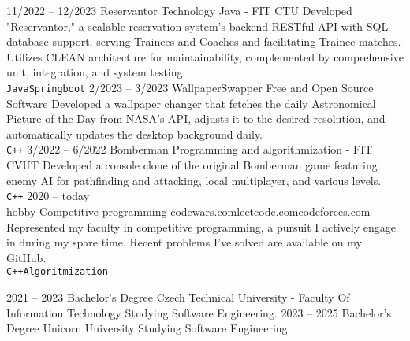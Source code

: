 \documentclass[9pt]{developercv} %
\begin{document}
\begin{entrylist}
	\entry
		{11/2022 -- 12/2023}
		{Reservantor}
		{Technology Java - FIT CTU}
		{Developed "Reservantor," a scalable reservation system's backend RESTful API with SQL database support, serving Trainees and Coaches and facilitating Trainee matches. Utilizes CLEAN architecture for maintainability, complemented by comprehensive unit, integration, and system testing.\\ \texttt{Java}\slashsep\texttt{Springboot}}
	\entry
		{2/2023 -- 3/2023}
		{WallpaperSwapper}
		{Free and Open Source Software}
		{Developed a wallpaper changer that fetches the daily Astronomical Picture of the Day from NASA's API, adjusts it to the desired resolution, and automatically updates the desktop background daily.\\ \texttt{C++}}
	\entry
		{3/2022 -- 6/2022}
		{Bomberman}
		{Programming and algorithmization - FIT CVUT}
		{Developed a console clone of the original Bomberman game featuring enemy AI for pathfinding and attacking, local multiplayer, and various levels.\\ \texttt{C++}}
	\entry
		{2020 -- today\\\footnotesize{hobby}}
		{Competitive programming}
		{codewars.com\slashsep leetcode.com\slashsep codeforces.com}
		{Represented my faculty in competitive programming, a pursuit I actively engage in during my spare time. Recent problems I've solved are available on my GitHub.\\ \texttt{C++}\slashsep\texttt{Algoritmization}}
\end{entrylist}



\begin{entrylist}
	\entry
		{2021 -- 2023}
		{Bachelor's Degree}
		{Czech Technical University - Faculty Of Information Technology}
		{Studying Software Engineering.}
	\entry
		{2023 -- 2025}
		{Bachelor's Degree}
		{Unicorn University}
		{Studying Software Engineering.}
\end{entrylist}

\end{document}
